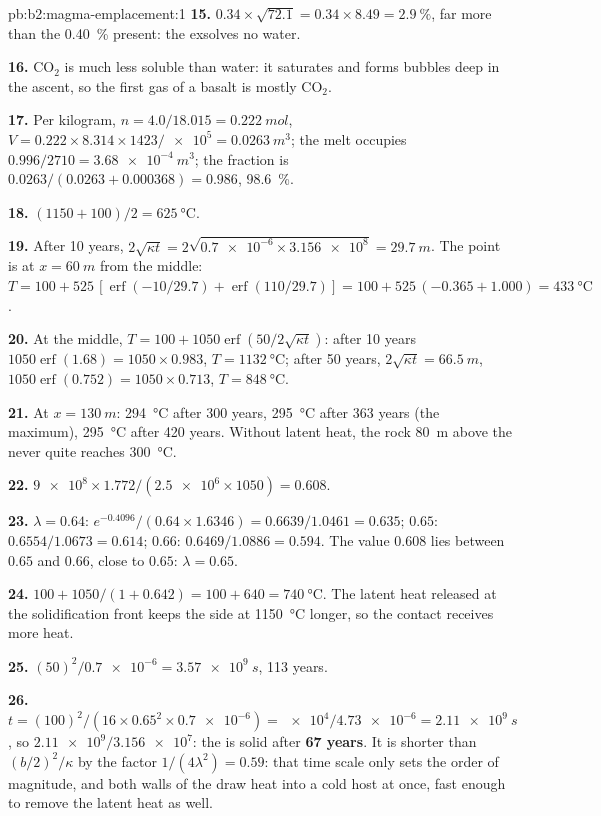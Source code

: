 \begin{solution}{pb:b2:magma-emplacement:1}
\textbf{15.} $0.34\times\sqrt{72.1} = 0.34\times8.49 = \qty{2.9}{\percent}$, far more than
the \qty{0.40}{\percent} present: the   exsolves no water.

\textbf{16.} CO$_2$ is much less soluble than water: it saturates and forms bubbles
deep in the ascent, so the first gas of a basalt is mostly CO$_2$.

\textbf{17.} Per kilogram, $n = 4.0/18.015 = \qty{0.222}{mol}$, $V = 0.222\times8.314\times1423/
\num{e5} = \qty{0.0263}{m^3}$; the melt occupies $0.996/2710 = \qty{3.68e-4}{m^3}$; the
fraction is $0.0263/(0.0263 + 0.000368) = 0.986$, \qty{98.6}{\percent}.

\textbf{18.} $(1150 + 100)/2 = \qty{625}{\celsius}$.

\textbf{19.} After 10 years, $2\sqrt{\kappa t} = 2\sqrt{\num{0.7e-6}\times\num{3.156e8}} =
\qty{29.7}{m}$. The point is at $x = \qty{60}{m}$ from the middle: $T = 100 +
525\,[\operatorname{erf}(-10/29.7) + \operatorname{erf}(110/29.7)] = 100 + 525\,(-0.365 +
1.000) = \qty{433}{\celsius}$.

\textbf{20.} At the middle, $T = 100 + 1050\operatorname{erf}(50/2\sqrt{\kappa t})$: after
10 years $1050\operatorname{erf}(1.68) = 1050\times0.983$, $T = \qty{1132}{\celsius}$; after
50 years, $2\sqrt{\kappa t} = \qty{66.5}{m}$, $1050\operatorname{erf}(0.752) = 1050\times0.713$,
$T = \qty{848}{\celsius}$.

\textbf{21.} At $x = \qty{130}{m}$: \qty{294}{\celsius} after 300 years,
\qty{295}{\celsius} after 363 years (the maximum), \qty{295}{\celsius} after 420
years. Without latent heat, the rock \qty{80}{m} above the  never quite
reaches \qty{300}{\celsius}.

\textbf{22.} $\num{9e8}\times1.772/(\num{2.5e6}\times1050) = 0.608$.

\textbf{23.} $\lambda = 0.64$: $e^{-0.4096}/(0.64\times1.6346) = 0.6639/1.0461 = 0.635$;
$0.65$: $0.6554/1.0673 = 0.614$; $0.66$: $0.6469/1.0886 = 0.594$. The value $0.608$
lies between $0.65$ and $0.66$, close to $0.65$: $\lambda = 0.65$.

\textbf{24.} $100 + 1050/(1 + 0.642) = 100 + 640 = \qty{740}{\celsius}$. The latent
heat released at the solidification front keeps the  side at
\qty{1150}{\celsius} longer, so the contact receives more heat.

\textbf{25.} $(50)^2/\num{0.7e-6} = \qty{3.57e9}{s}$, 113 years.

\textbf{26.} $t = (100)^2/(16\times0.65^2\times\num{0.7e-6}) = \num{e4}/\num{4.73e-6} =
\qty{2.11e9}{s}$, so $\num{2.11e9}/\num{3.156e7}$: the  is solid after
\textbf{\qty[text-series-to-math=true]{67}{} years}. It is shorter than
$(b/2)^2/\kappa$ by the factor $1/(4\lambda^2) = 0.59$: that time scale only sets
the order of magnitude, and both walls of the  draw heat into a cold host at
once, fast enough to remove the latent heat as well.
\end{solution}
